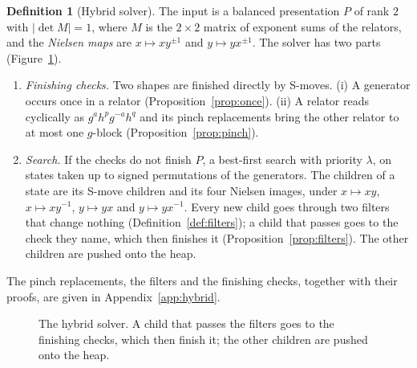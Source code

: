 \documentclass[11pt]{article}
\theoremstyle{definition}
\newtheorem{definition}[theorem]{Definition}
\theoremstyle{remark}
\begin{document}
\begin{definition}[Hybrid solver]\label{def:hybrid}
The input is a balanced presentation $P$ of rank $2$ with $|\det M|=1$, where $M$ is the $2\times2$ matrix of exponent
sums of the relators, and the \emph{Nielsen maps} are
$x\mapsto xy^{\pm1}$ and $y\mapsto yx^{\pm1}$. The solver has two parts (Figure~\ref{fig:hybrid}).
\begin{enumerate}
  \item \emph{Finishing checks.} Two shapes are finished directly by S-moves. (i) A generator occurs once in a relator
  (Proposition~\ref{prop:once}). (ii) A relator
  reads cyclically as $g^ah^pg^{-a}h^q$ and its pinch replacements bring the other relator to at most one $g$-block
  (Proposition~\ref{prop:pinch}).
  \item \emph{Search.} If the checks do not finish $P$, a best-first search with priority $\lambda$, on states taken
  up to signed permutations of the generators. The children of a state are its S-move children and its four Nielsen images, under
  $x\mapsto xy$, $x\mapsto xy^{-1}$, $y\mapsto yx$ and $y\mapsto yx^{-1}$. Every new child goes through two filters that change nothing
  (Definition~\ref{def:filters}); a child that passes goes to the check they name, which then finishes it
  (Proposition~\ref{prop:filters}). The other children are pushed onto the heap.
\end{enumerate}
\end{definition}

The pinch replacements, the filters and the finishing checks, together with their proofs, are given in Appendix~\ref{app:hybrid}.

\begin{figure}[ht]
\centering
{}
\caption{The hybrid solver. A child that passes the filters goes to the finishing checks, which then finish it; the
other children are pushed onto the heap.}
\label{fig:hybrid}
\end{figure}
\end{document}
